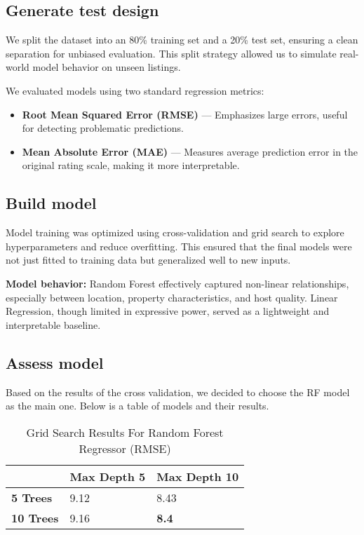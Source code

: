 \subsection{Generate test design}
We split the dataset into an 80\% training set and a 20\% test set, ensuring a clean separation for unbiased evaluation. This split strategy allowed us to simulate real-world model behavior on unseen listings.

We evaluated models using two standard regression metrics:
\begin{itemize}
  \item \textbf{Root Mean Squared Error (RMSE)} --- Emphasizes large errors, useful for detecting problematic predictions.
  \item \textbf{Mean Absolute Error (MAE)} --- Measures average prediction error in the original rating scale, making it more interpretable.
\end{itemize}

\subsection{Build model }
Model training was optimized using cross-validation and grid search to explore hyperparameters and reduce overfitting. This ensured that the final models were not just fitted to training data but generalized well to new inputs.

\textbf{Model behavior:}
Random Forest effectively captured non-linear relationships, especially between location, property characteristics, and host quality. Linear Regression, though limited in expressive power, served as a lightweight and interpretable baseline.

\subsection{Assess model }

Based on the results of the cross validation, we decided to choose the RF model as the main one. Below is a table of models and their results.

\begin{table}[ht!]
  \small
  \centering
  \caption{Grid Search Results For Random Forest Regressor (RMSE)}\label{tab:grid_search_rf_rmse}
  \begin{tabular}{lll}
    \toprule
                      & \textbf{Max Depth 5} & \textbf{Max Depth 10} \\
    \midrule
    \textbf{5 Trees}  & 9.12                 & 8.43                  \\
    \textbf{10 Trees} & 9.16                 & \textbf{8.4}          \\
    \bottomrule
  \end{tabular}
\end{table}


